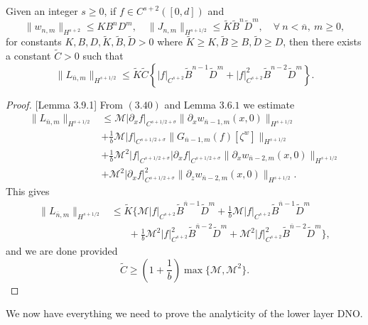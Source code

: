 \begin{lemma} Given an integer $s\ge 0$, if $f\in C^{s+2}([0,d])$ and
\begin{equation}\|w_{n,m}\|_{H^{s+2}} \le KB^{n}D^{m}, \quad \|J_{n,m}\|_{H^{s+1/2}}\le \tilde{K}\tilde{B}^{n}\tilde{D}^{m},\quad \forall~ n < \overline{n},~m\geq 0,\end{equation}
for constants $K,B,D,\tilde{K},\tilde{B},\tilde{D} > 0$ where $\tilde{K}\ge K,\tilde{B}\ge B, \tilde{D}\ge D$, then there exists a constant $\tilde{C} > 0$ such that
\begin{equation}\|L_{\overline{n},m}\|_{H^{s+1/2}} \le \tilde{K}\tilde{C}\left\{|f|_{C^{s+2}}\tilde{B}^{n-1}\tilde{D}^{m}+ |f|_{C^{s+2}}^2\tilde{B}^{n-2}\tilde{D}^{m}\right\}.\end{equation}
\end{lemma}
\vskip 0.1in
\begin{proof}{[Lemma 3.9.1]} From $(3.40)$ and Lemma $3.6.1$ we estimate
\begin{align*}\|L_{\overline{n},m}\|_{H^{s+1/2}}&\le \mathcal{M}|\partial_x f|_{C^{s+1/2+\sigma}}\|\partial_x w_{\overline{n}-1,m}(x,0)\|_{H^{s+1/2}}\\&
+\frac{1}{b}\mathcal{M}|f|_{C^{s+1/2+\sigma}}\|G_{\overline{n}-1,m}(f)[\zeta^w]\|_{H^{s+1/2}}\\&
+\frac{1}{b}\mathcal{M}^2|f|_{C^{s+1/2+\sigma}}|\partial_x f|_{C^{s+1/2+\sigma}}\|\partial_x w_{\overline{n}-2,m}(x,0)\|_{H^{s+1/2}}\\&
+\mathcal{M}^2|\partial_x f|^2_{C^{s+1/2+\sigma}}\|\partial_z w_{\overline{n}-2,m}(x,0)\|_{H^{s+1/2}}.
\end{align*}
This gives
\begin{align*}\|L_{\overline{n},m}\|_{H^{s+1/2}}&\le \tilde{K}\Big\{\mathcal{M}| f|_{C^{s+2}}\tilde{B}^{\overline{n}-1}\tilde{D}^{m} + \frac{1}{b}\mathcal{M}|f|_{C^{s+2}}\tilde{B}^{\overline{n}-1}\tilde{D}^{m} \\&~~~~~~~~+
\frac{1}{b}\mathcal{M}^2|f|_{C^{s+2}}^2\tilde{B}^{\overline{n}-2}\tilde{D}^{m} + \mathcal{M}^2|f|_{C^{s+2}}^2\tilde{B}^{\overline{n}-2}\tilde{D}^{m}\Big\},
\end{align*}
and we are done provided
$$\tilde{C} \ge \left(1+\frac{1}{b}\right)\max\{\mathcal{M},\mathcal{M}^2\}.$$
\end{proof}
\begin{flushleft}
We now have everything we need to prove the analyticity of the lower layer DNO.
\end{flushleft}
\vskip 0.1in

